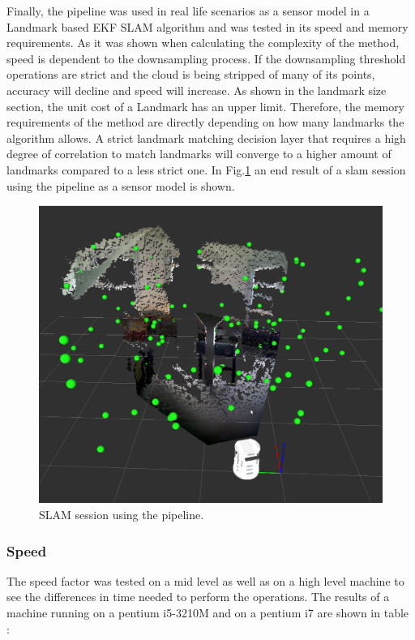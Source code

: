 \documentclass[twoside,hidelinks]{article}
\begin{document}
Finally, the pipeline was used in real life scenarios as a sensor model in a Landmark based EKF SLAM algorithm and was tested in its speed and memory requirements. As it was shown when calculating the complexity of the method, speed is dependent to the downsampling process. If the downsampling threshold operations are strict and the cloud is being stripped of many of its points, accuracy will decline and speed will increase. As shown in the landmark size section, the unit cost of a Landmark has an upper limit. Therefore, the memory requirements of the method are directly depending on how many landmarks the algorithm allows. A strict landmark matching decision layer that requires a high degree of correlation to match landmarks will converge to a higher amount of landmarks compared to a less strict one. In Fig.\ref{slam} an end result of a slam session using the pipeline as a sensor model is shown.

\begin{figure}[h!]
  \centering
    \includegraphics[width=.8\textwidth]{slam110landmarks2}
    \caption{SLAM session using the pipeline.}
  \label{slam}
\end{figure}


\subsubsection{Speed}

The speed factor was tested on a mid level as well as on a high level machine to see the differences in time needed to perform the operations. The results of a machine running on a pentium i5-3210M and on a pentium i7 are shown in table \label{bench}:
\end{document}
